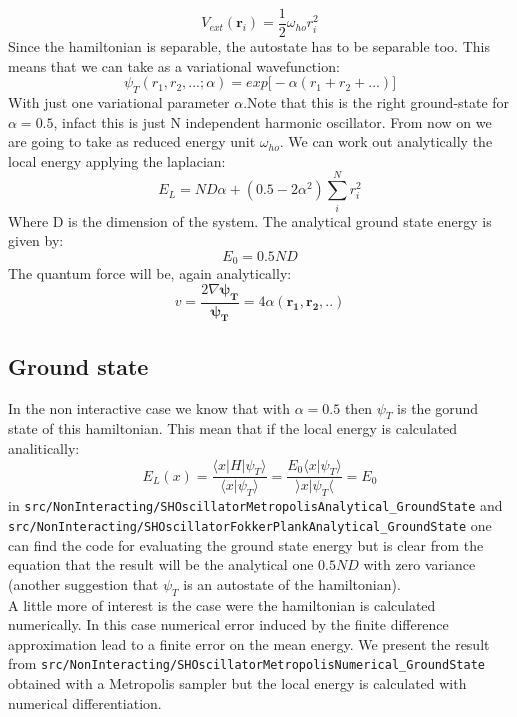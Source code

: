 \documentclass{article}
\begin{document}
\begin{equation}
     V_{ext}(\mathbf{r}_i) = \frac{1}{2}\omega_{ho}r_i^2
\end{equation}
Since the hamiltonian is separable, the autostate has to be separable too. This means that we can take as a variational wavefunction:
\begin{equation}
    \psi_T(r_1, r_2, ...; \alpha) = exp\big[-\alpha(r_1 + r_2 + ...) ]
\end{equation}
With just one variational parameter $\alpha$.Note that this is the right ground-state for $\alpha = 0.5$, infact this is just N independent harmonic oscillator. From now on we are going to take as reduced energy unit $\omega_{ho}$. 
We can work out analytically the local energy applying the laplacian:
\begin{equation}
    E_L = N D \alpha + (0.5 - 2\alpha^2)\sum_i^N r_i^2
\end{equation}
Where D is the dimension of the system. The analytical ground state energy is given by:
\begin{equation}
    E_0 = 0.5  N  D
\end{equation}
The quantum force will be, again analytically:
\begin{equation}
    v = \frac{2\nabla \mathbf{\psi_T}}{\mathbf{\psi_T}} = 4 \alpha (\mathbf{r_1}, \mathbf{r_2}, ..)
\end{equation}

\subsection{Ground state}
In the non interactive case we know that with $\alpha = 0.5$ then $\psi_T$ is the gorund state of this hamiltonian. This mean that if the local energy is calculated analitically:
\begin{equation}
    E_L(x) = \frac{\langle x | H | \psi_T \rangle}{\langle x | \psi_T \rangle} = \frac{E_0\langle x | \psi_T \rangle}{\rangle x | \psi_T \langle} = E_0
\end{equation}
in \texttt{src/NonInteracting/SHOscillatorMetropolisAnalytical\_GroundState} and \texttt{src/NonInteracting/SHOscillatorFokkerPlankAnalytical\_GroundState} one can find the code for evaluating the ground state energy but is clear from the equation that the result will be the analytical one $0.5ND$ with zero variance (another suggestion that $\psi_T$ is an autostate of the hamiltonian). \\

A little more of interest is the case were the hamiltonian is calculated numerically. In this case numerical error induced by the finite difference approximation lead to a finite error on the mean energy. We present the result from \texttt{src/NonInteracting/SHOscillatorMetropolisNumerical\_GroundState} obtained with a Metropolis sampler but the local energy is calculated with numerical differentiation.\\
\end{document}
